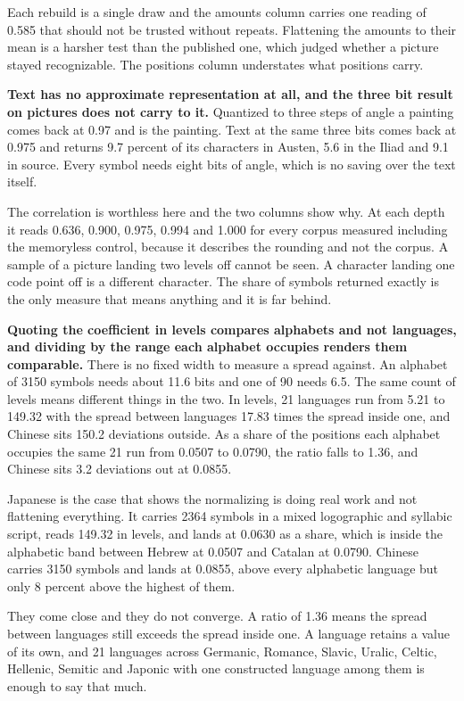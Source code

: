 Each rebuild is a single draw and the amounts column carries one reading of 0.585 that should not be trusted without repeats. Flattening the amounts to their mean is a harsher test than the published one, which judged whether a picture stayed recognizable. The positions column understates what positions carry.

\textbf{Text has no approximate representation at all, and the three bit result on pictures does not carry to it.} Quantized to three steps of angle a painting comes back at 0.97 and is the painting. Text at the same three bits comes back at 0.975 and returns 9.7 percent of its characters in Austen, 5.6 in the Iliad and 9.1 in source. Every symbol needs eight bits of angle, which is no saving over the text itself.

The correlation is worthless here and the two columns show why. At each depth it reads 0.636, 0.900, 0.975, 0.994 and 1.000 for every corpus measured including the memoryless control, because it describes the rounding and not the corpus. A sample of a picture landing two levels off cannot be seen. A character landing one code point off is a different character. The share of symbols returned exactly is the only measure that means anything and it is far behind.

\textbf{Quoting the coefficient in levels compares alphabets and not languages, and dividing by the range each alphabet occupies renders them comparable.} There is no fixed width to measure a spread against. An alphabet of 3150 symbols needs about 11.6 bits and one of 90 needs 6.5. The same count of levels means different things in the two. In levels, 21 languages run from 5.21 to 149.32 with the spread between languages 17.83 times the spread inside one, and Chinese sits 150.2 deviations outside. As a share of the positions each alphabet occupies the same 21 run from 0.0507 to 0.0790, the ratio falls to 1.36, and Chinese sits 3.2 deviations out at 0.0855.

Japanese is the case that shows the normalizing is doing real work and not flattening everything. It carries 2364 symbols in a mixed logographic and syllabic script, reads 149.32 in levels, and lands at 0.0630 as a share, which is inside the alphabetic band between Hebrew at 0.0507 and Catalan at 0.0790. Chinese carries 3150 symbols and lands at 0.0855, above every alphabetic language but only 8 percent above the highest of them.

They come close and they do not converge. A ratio of 1.36 means the spread between languages still exceeds the spread inside one. A language retains a value of its own, and 21 languages across Germanic, Romance, Slavic, Uralic, Celtic, Hellenic, Semitic and Japonic with one constructed language among them is enough to say that much.

